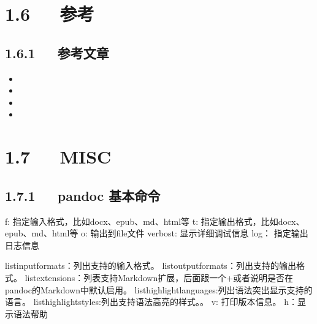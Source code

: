 \documentclass[letterpaper,12pt,english]{sphinxmanual}
\begin{document}
\section{1.6   参考}
\label{\detokenize{001software/001install/pandoc:id6}}

\subsection{1.6.1   参考文章}
\label{\detokenize{001software/001install/pandoc:id7}}\begin{itemize}
\item {} 

\item {} 

\item {} 

\item {} 

\end{itemize}


\section{1.7   MISC}
\label{\detokenize{001software/001install/pandoc:misc}}

\subsection{1.7.1   pandoc 基本命令}
\label{\detokenize{001software/001install/pandoc:id8}}
\begin{sphinxVerbatim}[commandchars=\\\{\}]
\PYGZhy{}f: 指定输入格式，比如docx、epub、md、html等
\PYGZhy{}t: 指定输出格式，比如docx、epub、md、html等
\PYGZhy{}o: 输出到file文件
\PYGZhy{}\PYGZhy{}verbost: 显示详细调试信息
\PYGZhy{}\PYGZhy{}log： 指定输出日志信息

\PYGZhy{}\PYGZhy{}list\PYGZhy{}input\PYGZhy{}formats：列出支持的输入格式。
\PYGZhy{}\PYGZhy{}list\PYGZhy{}output\PYGZhy{}formats：列出支持的输出格式。
\PYGZhy{}\PYGZhy{}list\PYGZhy{}extensions：列表支持Markdown扩展，后面跟一个+或者\PYGZhy{}说明是否在pandoc的Markdown中默认启用。
\PYGZhy{}\PYGZhy{}list\PYGZhy{}highlight\PYGZhy{}languages:列出语法突出显示支持的语言。
\PYGZhy{}\PYGZhy{}list\PYGZhy{}highlight\PYGZhy{}styles:列出支持语法高亮的样式。。
\PYGZhy{}v: 打印版本信息。
\PYGZhy{}h：显示语法帮助
\end{sphinxVerbatim}
\end{document}
